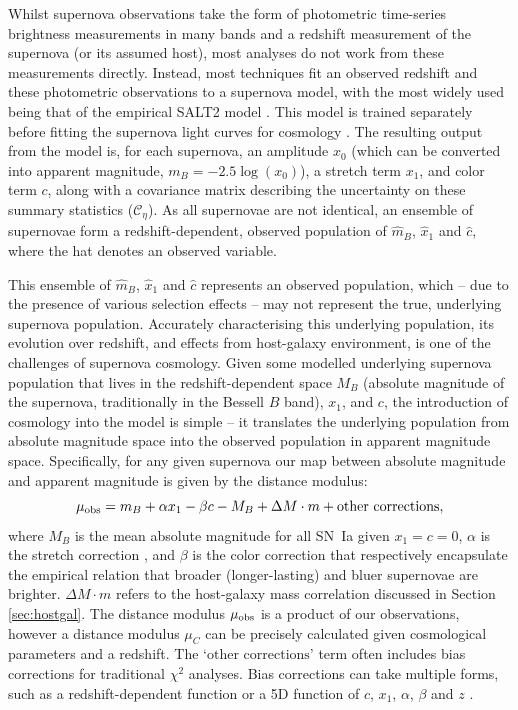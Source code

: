 \documentclass[twocolumn,trackchanges,tighten]{aastex62}
\begin{document}
Whilst supernova observations take the form of photometric time-series brightness measurements in many bands and a redshift measurement of the supernova (or its assumed host), most analyses do not work from these measurements directly. Instead, most techniques fit an observed redshift and these photometric observations to a supernova model, with the most widely used being that of the empirical SALT2 model \citep{Guy2007, Guy2010}. This model is trained separately before fitting the supernova light curves for cosmology \citep{Guy2010, Betoule2014}. The resulting output from the model is, for each supernova, an amplitude $x_0$ (which can be converted into apparent magnitude, $m_B = -2.5\log(x_0)$), a stretch term $x_1$, and color term $c$, along with a covariance matrix describing the uncertainty on these summary statistics ($\mathcal{C_\eta}$). As all supernovae are not identical, an ensemble of supernovae form a redshift-dependent, observed population of $\hat{m}_B$, $\hat{x}_1$ and $\hat{c}$, where the hat denotes an observed variable.

This ensemble of $\hat{m}_B$, $\hat{x}_1$ and $\hat{c}$ represents an observed population, which -- due to the presence of various selection effects -- may not represent the true, underlying supernova population. Accurately characterising this underlying population, its evolution over redshift, and effects from host-galaxy environment, is one of the challenges of supernova cosmology. Given some modelled underlying supernova population that lives in the redshift-dependent space $M_B$ (absolute magnitude of the supernova, traditionally in the Bessell $B$ band), $x_1$, and $c$, the introduction of cosmology into the model is simple -- it translates the underlying population from absolute magnitude space into the observed population in apparent magnitude space. Specifically, for any given supernova our map between absolute magnitude and apparent magnitude is given by the distance modulus:
\begin{equation}
\mu_{\rm obs} = m_B + \alpha x_1 - \beta c - M_B + \Delta M \cdot m + \text{other corrections}, \label{eq:standard}
\end{equation}
where $M_B$ is the mean absolute magnitude for all SN~Ia given $x_1=c=0$,  $\alpha$ is the stretch correction \citep{Phillips1993, Phillips1999}, and $\beta$ is the color correction \citep{Tripp1998} that respectively encapsulate the empirical relation that broader (longer-lasting) and bluer supernovae are brighter. $\Delta M \cdot m$ refers to the host-galaxy mass correlation discussed in Section \ref{sec:hostgal}. The distance modulus $\mu_{\rm obs}$ is a product of our observations, however a distance modulus $\mu_C$ can be precisely calculated given cosmological parameters and a redshift. The `$\text{other corrections}$' term often includes bias corrections for traditional $\chi^2$ analyses. Bias corrections can take multiple forms, such as a redshift-dependent function \citep{Betoule2014} or a 5D function of $c$, $x_1$, $\alpha$, $\beta$ and $z$ \citep{Kessler2017, Scolnic2017}.
\end{document}

